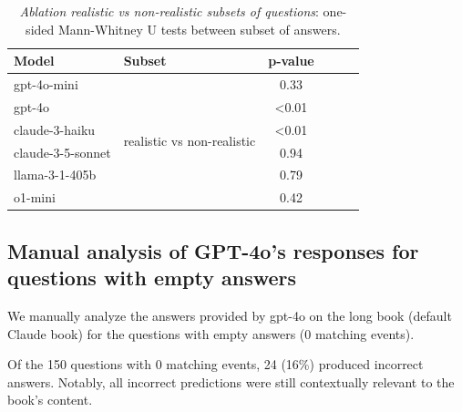 \documentclass{article}
\begin{document}
\begin{table}[htbp]
\caption{\textit{Ablation realistic vs non-realistic subsets of questions}: one-sided Mann-Whitney U tests between subset of answers.}
\label{tab:pvalue_realistic_vs_nonrealistic}
\centering
\begin{tabular}{@{}llcccc@{}}
\toprule
 \bf Model & \bf Subset & \bf p-value \\ \midrule
 gpt-4o-mini & \multirow{6}{*}{realistic vs non-realistic} & 0.33 & \\
gpt-4o &    & <0.01 \\
claude-3-haiku &   & <0.01 \\
claude-3-5-sonnet &   & 0.94 \\
llama-3-1-405b &   & 0.79 \\
o1-mini &   & 0.42 \\ \bottomrule
\end{tabular}
\end{table}


\subsection{Manual analysis of GPT-4o's responses for questions with empty answers}

We manually analyze the answers provided by gpt-4o on the long book (default Claude book) for the questions with empty answers (0 matching events).

Of the 150 questions with 0 matching events, 24 (16\%) produced incorrect answers. Notably, all incorrect predictions were still contextually relevant to the book's content.
\end{document}
